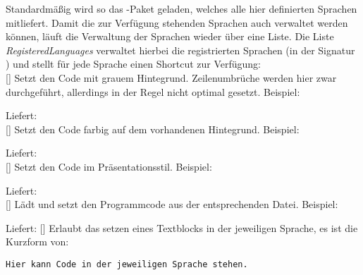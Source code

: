 Standardmäßig wird so das -Paket geladen, welches alle hier definierten Sprachen mitliefert. Damit die zur Verfügung stehenden Sprachen auch verwaltet werden können, läuft die Verwaltung der Sprachen wieder über eine Liste. Die Liste \emph{RegisteredLanguages} verwaltet hierbei die registrierten Sprachen (in der Signatur ) und stellt für jede Sprache einen Shortcut zur Verfügung:\\
%
%
%
[]
Setzt den Code mit grauem Hintegrund. Zeilenumbrüche werden hier zwar durchgeführt, allerdings in der Regel nicht optimal gesetzt. Beispiel: \begin{latex}
\end{latex}
Liefert: \\
%
%
%
[]
Setzt den Code farbig auf dem vorhandenen Hintegrund. Beispiel: \begin{latex}
\end{latex}
Liefert: \\
%
%
%
[]
Setzt den Code im Präsentationsstil. Beispiel: \begin{latex}
\end{latex}
Liefert: \\
%
%
%
[]
Lädt und setzt den Programmcode aus der entsprechenden Datei. Beispiel: \begin{latex}
\end{latex}
Liefert: 
%
%
%
[]
Erlaubt das setzen eines Textblocks in der jeweiligen Sprache, es ist die Kurzform von:
\begin{latex}
\begin{lstlisting}[style=\pgfkeysvalueof{/lillyxLISTINGS/globals/listing style},language=<Sprache>]
    Hier kann Code in der jeweiligen Sprache stehen.
\end{lstlisting}
\end{latex}

